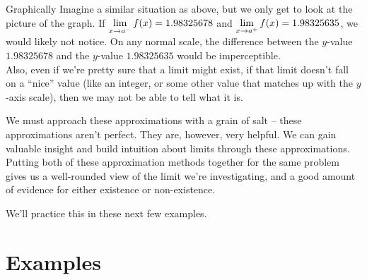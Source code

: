 \begin{describe}{Graphically}
  Imagine a similar situation as above, but we only get to look at the picture of the graph.
  If $\displaystyle \lim_{x\to a^-} f(x) = 1.98325678$ and $\displaystyle \lim_{x\to a^+} f(x) = 1.98325635$, we would likely not notice.
  On any normal scale, the difference between the $y$-value $1.98325678$ and the $y$-value $1.98325635$ would be imperceptible.\\

  Also, even if we're pretty sure that a limit might exist, if that limit doesn't fall on a ``nice'' value (like an integer, or some other value that matches up with the $y$-axis scale), then we may not be able to tell what it is.
\end{describe}

We must approach these approximations with a grain of salt -- these approximations aren't perfect.
They are, however, very helpful.
We can gain valuable insight and build intuition about limits through these approximations.
Putting both of these approximation methods together for the same problem gives us a well-rounded view of the limit we're investigating, and a good amount of evidence for either existence or non-existence.

We'll practice this in these next few examples.

\section*{Examples}


